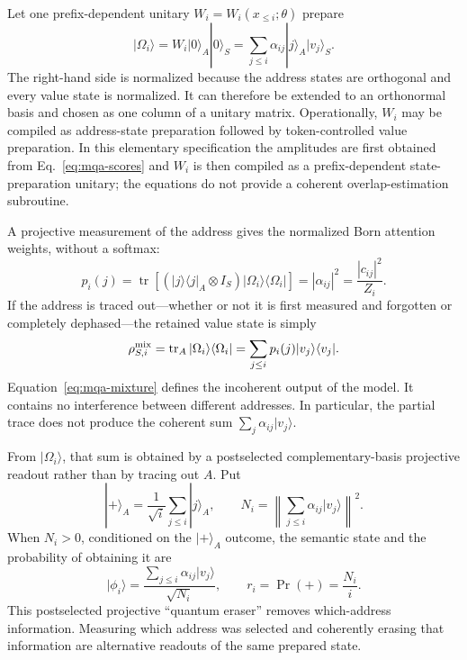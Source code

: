 \documentclass[
  aps,
  reprint,
  superscriptaddress,
  floatfix,
  nofootinbib,
  longbibliography
]{revtex4-2}
\begin{document}
Let one prefix-dependent unitary $W_i=W_i(x_{\leq i};\theta)$ prepare
\begin{equation}
 |\Omega_i\rangle
 =W_i|0\rangle_A|0\rangle_S
 =\sum_{j\leq i}\alpha_{ij}|j\rangle_A|v_j\rangle_S .
\label{eq:mqa-unitary}
\end{equation}
The right-hand side is normalized because the address states are orthogonal
and every value state is normalized.  It can therefore be extended to an
orthonormal basis and chosen as one column of a unitary matrix.
Operationally, $W_i$ may be compiled as address-state preparation followed by
token-controlled value preparation.  In this elementary specification the
amplitudes are first obtained from Eq.~\eqref{eq:mqa-scores} and $W_i$ is then
compiled as a prefix-dependent state-preparation unitary; the equations do not
provide a coherent overlap-estimation subroutine.

A projective measurement of the address gives the normalized Born attention
weights, without a softmax:
\begin{equation}
 p_i(j)
 =\operatorname{tr}\!\left[
 (|j\rangle\langle j|_A\otimes I_S)
 |\Omega_i\rangle\langle\Omega_i|
 \right]
 =|\alpha_{ij}|^2
 =\frac{|c_{ij}|^2}{Z_i}.
\label{eq:mqa-address}
\end{equation}
If the address is traced out---whether or not it is first measured and
forgotten or completely dephased---the retained value state is simply
\begin{equation}
 \rho_{S,i}^{\rm mix}
 =\operatorname{tr}_A|\Omega_i\rangle\langle\Omega_i|
 =\sum_{j\leq i}p_i(j)|v_j\rangle\langle v_j|.
\label{eq:mqa-mixture}
\end{equation}
Equation~\eqref{eq:mqa-mixture} defines the incoherent output of the model.
It contains no interference between different addresses.  In
particular, the partial trace does not produce the coherent sum
$\sum_j\alpha_{ij}|v_j\rangle$.

From $|\Omega_i\rangle$, that sum is obtained by a postselected
complementary-basis projective readout rather than by tracing out $A$.  Put
\begin{equation}
 |+\rangle_A=\frac{1}{\sqrt{i}}\sum_{j\leq i}|j\rangle_A,\qquad
 N_i=\left\|\sum_{j\leq i}\alpha_{ij}|v_j\rangle\right\|^2 .
\label{eq:mqa-erasure}
\end{equation}
When $N_i>0$, conditioned on the $|+\rangle_A$ outcome, the semantic state and the
probability of obtaining it are
\begin{equation}
 |\phi_i\rangle
 =\frac{\sum_{j\leq i}\alpha_{ij}|v_j\rangle}{\sqrt{N_i}},
 \qquad
 r_i=\Pr(+)=\frac{N_i}{i}.
\label{eq:mqa-coherent}
\end{equation}
This postselected projective ``quantum eraser'' removes which-address information.
Measuring which address was selected and coherently erasing that information
are alternative readouts of the same prepared state.
\end{document}
